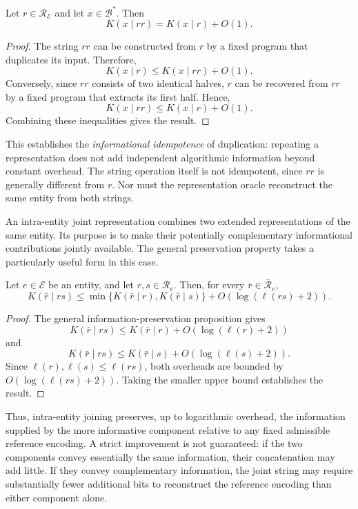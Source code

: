 \begin{proposition}
Let $r\in\mathcal{R}_{\mathcal{E}}$ and let $x\in\mathcal{B}^\ast$. Then
\[
K(x\mid rr)=K(x\mid r)+O(1).
\]
\end{proposition}
\begin{proof}
The string $rr$ can be constructed from $r$ by a fixed program that duplicates its input. Therefore,
\[
K(x\mid r)\leq K(x\mid rr)+O(1).
\]
Conversely, since $rr$ consists of two identical halves, $r$ can be recovered from $rr$ by a fixed program that extracts its first half. Hence,
\[
K(x\mid rr)\leq K(x\mid r)+O(1).
\]
Combining these inequalities gives the result.
\end{proof}

This establishes the \emph{informational idempotence} of duplication: repeating a representation does not add independent algorithmic information beyond constant overhead. The string operation itself is not idempotent, since $rr$ is generally different from $r$. Nor must the representation oracle reconstruct the same entity from both strings.

An intra-entity joint representation combines two extended representations of the same entity. Its purpose is to make their potentially complementary informational contributions jointly available. The general preservation property takes a particularly useful form in this case.

\begin{proposition}
Let $e\in\mathcal{E}$ be an entity, and let $r,s\in\mathcal{R}_e$. Then, for every $\bar r\in\bar{\mathcal{R}}_e$,
\[
K(\bar r\mid rs)\leq
\min\{K(\bar r\mid r),K(\bar r\mid s)\}
+O(\log(\ell(rs)+2)).
\]
\end{proposition}
\begin{proof}
The general information-preservation proposition gives
\[
K(\bar r\mid rs)\leq K(\bar r\mid r)+O(\log(\ell(r)+2))
\]
and
\[
K(\bar r\mid rs)\leq K(\bar r\mid s)+O(\log(\ell(s)+2)).
\]
Since $\ell(r),\ell(s)\leq\ell(rs)$, both overheads are bounded by $O(\log(\ell(rs)+2))$. Taking the smaller upper bound establishes the result.
\end{proof}

Thus, intra-entity joining preserves, up to logarithmic overhead, the information supplied by the more informative component relative to any fixed admissible reference encoding. A strict improvement is not guaranteed: if the two components convey essentially the same information, their concatenation may add little. If they convey complementary information, the joint string may require substantially fewer additional bits to reconstruct the reference encoding than either component alone.

